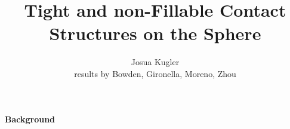 \documentclass{beamer}
\title[] %
{Tight and non-Fillable Contact Structures on the Sphere}
\subtitle
{}
\author[Josua Kugler] %
{Josua Kugler \texorpdfstring{\\}{,}results by Bowden\inst{\footnote{University of Regensburg}}, Gironella\inst{\footnote{University of Nantes}}, Moreno\inst{\footnote{Heidelberg University}}, Zhou\inst{\footnote{Morningside Center of Mathematics, CAS}}}
\institute%
{Heidelberg University}
\date[VU Amsterdam] %
\newtheorem{conjecture}{Conjecture}
\begin{document}
\begin{frame}
  \titlepage
\end{frame}












    

\begin{frame}
\begin{tcolorbox}
\Huge \begin{center}
    \textbf{Background}
\end{center}
\end{tcolorbox}
\end{frame}
\end{document}
